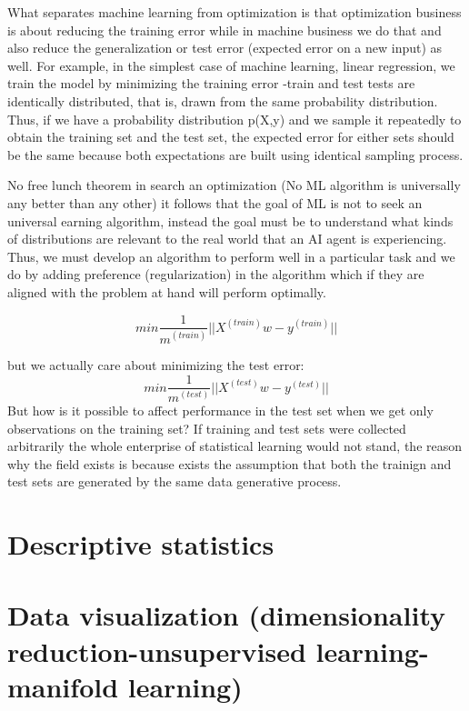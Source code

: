 \documentclass[11pt]{article}
\begin{document}
What separates machine learning from optimization is that optimization business is about reducing the training error  while in machine business we do that and also reduce the generalization or test error (expected error on a new input) as well. For example, in the simplest case of machine learning, linear regression, we train the model by minimizing the training error -train and test tests are identically distributed, that is, drawn from the same probability distribution. Thus, if we have a probability distribution p(X,y) and we sample it repeatedly to obtain the training set and the test set, the expected error for either sets should be the same because both expectations are built using identical sampling process.

No free lunch theorem in search an optimization \cite{wolpert1997no} (No ML algorithm is universally any better than any other) it follows that the goal of ML is not to seek an universal earning algorithm, instead the goal must be to understand what kinds of distributions are relevant to the real world that an AI agent is experiencing. Thus, we must develop an algorithm to perform well in a particular task and we do by adding preference (regularization) in the algorithm which if they are aligned with the problem at hand will perform optimally.


\begin{equation}
min \frac{1}{m^{(train)}} ||X^{(train)}w - y^{(train)}||
\end{equation}

but we actually care about minimizing the test error:
\begin{equation}
min \frac{1}{m^{(test)}} ||X^{(test)}w - y^{(test)}||
\end{equation}
But how is it possible to affect performance in the test set when we get only observations on the training set? If training and test sets were collected arbitrarily the whole enterprise of statistical learning would not stand, the reason why the field exists is because exists the assumption that both the trainign and test sets are generated by the same data generative process.






\section{Descriptive statistics}

\section{Data visualization (dimensionality reduction-unsupervised learning-manifold learning)}
\end{document}
